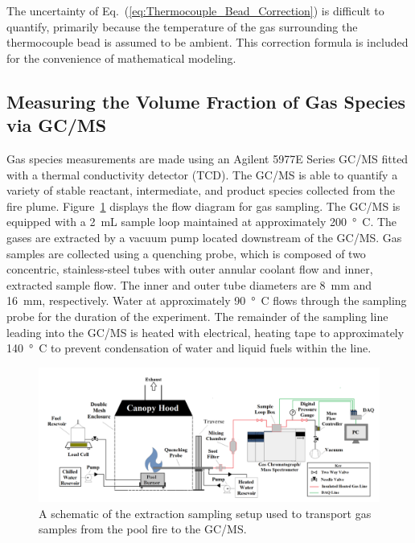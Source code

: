 \documentclass[12pt]{article}
\begin{document}
The uncertainty of Eq.~(\ref{eq:Thermocouple_Bead_Correction}) is difficult to quantify, primarily because the temperature of the gas surrounding the thermocouple bead is assumed to be ambient. This correction formula is included for the convenience of mathematical modeling.


\subsection{Measuring the Volume Fraction of Gas Species via GC/MS}
\label{ssec:Gas_Species_Setup}

Gas species measurements are made using an Agilent 5977E Series GC/MS fitted with a thermal conductivity detector (TCD). The GC/MS is able to quantify a variety of stable reactant, intermediate, and product species collected from the fire plume. Figure~\ref{fig:Experimental_Setup} displays the flow diagram for gas sampling. The GC/MS is equipped with a 2~mL sample loop maintained at approximately \SI{200}{\degree C}. The gases are extracted by a vacuum pump located downstream of the GC/MS. Gas samples are collected using a quenching probe, which is composed of two concentric, stainless-steel tubes with outer annular coolant flow and inner, extracted sample flow. The inner and outer tube diameters are \SI{8}{mm} and \SI{16}{mm}, respectively. Water at approximately \SI{90}{\degree C} flows through the sampling probe for the duration of the experiment. The remainder of the sampling line leading into the GC/MS is heated with electrical, heating tape to approximately \SI{140}{\degree C} to prevent condensation of water and liquid fuels within the line.

\begin{figure}
	\centering
\includegraphics[width=\textwidth,keepaspectratio]{Experimental_Setup.png}
	\caption[A schematic of the gas sampling procedure]{A schematic of the extraction sampling setup used to transport gas samples from the pool fire to the GC/MS.}
	\label{fig:Experimental_Setup}
\end{figure}
\end{document}
